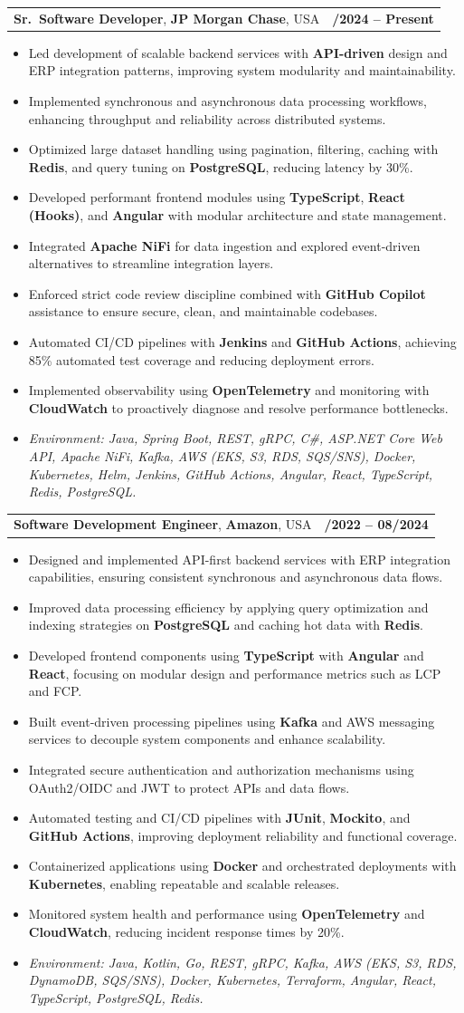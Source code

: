 \documentclass[letterpaper,11pt]{article}
\makeatletter
\newcommand{\resumeItem}[1]{
  \item\footnotesize{
    {#1 \vspace{-2pt}}
  }
}
\newcommand{\resumeSubheading}[4]{
  \vspace{-2pt}\item
    \begin{tabular*}{1.0\textwidth}[t]{l@{\extracolsep{\fill}}r}
      \textbf{\fontsize{10pt}{14pt}\selectfont #3}, \textbf{\fontsize{10pt}{14pt}\selectfont #1}, \fontsize{10pt}{14pt}\selectfont #4 & \textbf{\fontsize{10pt}{14pt}\selectfont #2} \\
    \end{tabular*}\vspace{-7pt}
}
\newcommand{\resumeItemListStart}{\begin{itemize}[leftmargin=*]}
\newcommand{\resumeItemListEnd}{\end{itemize}\vspace{-5pt}}
\makeatother
\begin{document}
\resumeSubheading
{JP Morgan Chase}{09/2024 -- Present}
{Sr.\ Software Developer}{USA}
\resumeItemListStart
  \resumeItem{Led development of scalable backend services with \textbf{API-driven} design and ERP integration patterns, improving system modularity and maintainability.}
  \resumeItem{Implemented synchronous and asynchronous data processing workflows, enhancing throughput and reliability across distributed systems.}
  \resumeItem{Optimized large dataset handling using pagination, filtering, caching with \textbf{Redis}, and query tuning on \textbf{PostgreSQL}, reducing latency by 30\%.}
  \resumeItem{Developed performant frontend modules using \textbf{TypeScript}, \textbf{React (Hooks)}, and \textbf{Angular} with modular architecture and state management.}
  \resumeItem{Integrated \textbf{Apache NiFi} for data ingestion and explored event-driven alternatives to streamline integration layers.}
  \resumeItem{Enforced strict code review discipline combined with \textbf{GitHub Copilot} assistance to ensure secure, clean, and maintainable codebases.}
  \resumeItem{Automated CI/CD pipelines with \textbf{Jenkins} and \textbf{GitHub Actions}, achieving 85\% automated test coverage and reducing deployment errors.}
  \resumeItem{Implemented observability using \textbf{OpenTelemetry} and monitoring with \textbf{CloudWatch} to proactively diagnose and resolve performance bottlenecks.}
  \resumeItem{\textit{Environment: Java, Spring Boot, REST, gRPC, C\#, ASP.NET Core Web API, Apache NiFi, Kafka, AWS (EKS, S3, RDS, SQS/SNS), Docker, Kubernetes, Helm, Jenkins, GitHub Actions, Angular, React, TypeScript, Redis, PostgreSQL.}}
\resumeItemListEnd

\resumeSubheading
{Amazon}{10/2022 -- 08/2024}
{Software Development Engineer}{USA}
\resumeItemListStart
  \resumeItem{Designed and implemented API-first backend services with ERP integration capabilities, ensuring consistent synchronous and asynchronous data flows.}
  \resumeItem{Improved data processing efficiency by applying query optimization and indexing strategies on \textbf{PostgreSQL} and caching hot data with \textbf{Redis}.}
  \resumeItem{Developed frontend components using \textbf{TypeScript} with \textbf{Angular} and \textbf{React}, focusing on modular design and performance metrics such as LCP and FCP.}
  \resumeItem{Built event-driven processing pipelines using \textbf{Kafka} and AWS messaging services to decouple system components and enhance scalability.}
  \resumeItem{Integrated secure authentication and authorization mechanisms using OAuth2/OIDC and JWT to protect APIs and data flows.}
  \resumeItem{Automated testing and CI/CD pipelines with \textbf{JUnit}, \textbf{Mockito}, and \textbf{GitHub Actions}, improving deployment reliability and functional coverage.}
  \resumeItem{Containerized applications using \textbf{Docker} and orchestrated deployments with \textbf{Kubernetes}, enabling repeatable and scalable releases.}
  \resumeItem{Monitored system health and performance using \textbf{OpenTelemetry} and \textbf{CloudWatch}, reducing incident response times by 20\%.}
  \resumeItem{\textit{Environment: Java, Kotlin, Go, REST, gRPC, Kafka, AWS (EKS, S3, RDS, DynamoDB, SQS/SNS), Docker, Kubernetes, Terraform, Angular, React, TypeScript, PostgreSQL, Redis.}}
\resumeItemListEnd
\end{document}

